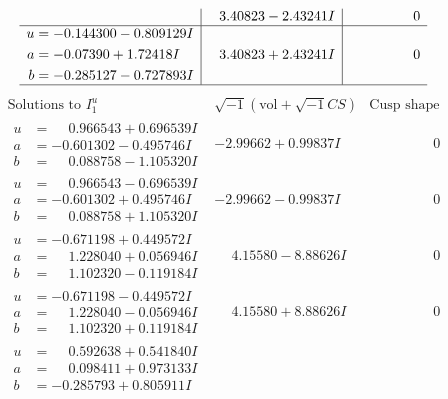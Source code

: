 \documentclass[1p]{elsarticle_modified}
\theoremstyle{definition}
\newcommand{\I}{\sqrt{-1}}
\begin{document}
$$\begin{array}{c|c|c}
 & \phantom{-}3.40823 - 2.43241 I & \phantom{-0.000000 } 0 \\ \hline\begin{aligned}
u &= -0.144300 - 0.809129 I \\
a &= -0.07390 + 1.72418 I \\
b &= -0.285127 - 0.727893 I\end{aligned}
 & \phantom{-}3.40823 + 2.43241 I & \phantom{-0.000000 } 0\\
 \hline 
 \end{array}$$\newpage$$\begin{array}{c|c|c}  
\text{Solutions to }I^u_{1}& \I (\text{vol} + \sqrt{-1}CS) & \text{Cusp shape}\\
 \hline 
\begin{aligned}
u &= \phantom{-}0.966543 + 0.696539 I \\
a &= -0.601302 - 0.495746 I \\
b &= \phantom{-}0.088758 - 1.105320 I\end{aligned}
 & -2.99662 + 0.99837 I & \phantom{-0.000000 } 0 \\ \hline\begin{aligned}
u &= \phantom{-}0.966543 - 0.696539 I \\
a &= -0.601302 + 0.495746 I \\
b &= \phantom{-}0.088758 + 1.105320 I\end{aligned}
 & -2.99662 - 0.99837 I & \phantom{-0.000000 } 0 \\ \hline\begin{aligned}
u &= -0.671198 + 0.449572 I \\
a &= \phantom{-}1.228040 + 0.056946 I \\
b &= \phantom{-}1.102320 - 0.119184 I\end{aligned}
 & \phantom{-}4.15580 - 8.88626 I & \phantom{-0.000000 } 0 \\ \hline\begin{aligned}
u &= -0.671198 - 0.449572 I \\
a &= \phantom{-}1.228040 - 0.056946 I \\
b &= \phantom{-}1.102320 + 0.119184 I\end{aligned}
 & \phantom{-}4.15580 + 8.88626 I & \phantom{-0.000000 } 0 \\ \hline\begin{aligned}
u &= \phantom{-}0.592638 + 0.541840 I \\
a &= \phantom{-}0.098411 + 0.973133 I \\
b &= -0.285793 + 0.805911 I\end{aligned}

\end{array}$$
\end{document}
